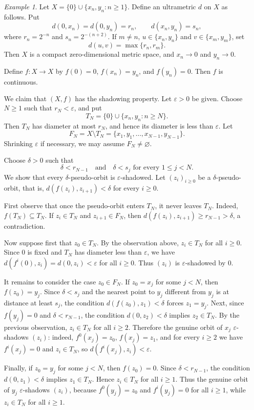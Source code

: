 \documentclass[12pt]{amsart}
\theoremstyle{definition}
\numberwithin{equation}{section}
\theoremstyle{remark}
\newtheorem{example}[theorem]{Example}
\begin{document}
\begin{example}
Let $X=\{0\}\cup\{x_n,y_n:n\geq 1\}$. Define an ultrametric $d$ on $X$ as
follows. Put
\[
    d(0,x_n)=d(0,y_n)=r_n,\qquad d(x_n,y_n)=s_n,
\]
where $r_n=2^{-n}$ and $s_n=2^{-(n+2)}$. If $m\neq n$,
$u\in\{x_n,y_n\}$ and $v\in\{x_m,y_m\}$, set
\[
    d(u,v)=\max\{r_n,r_m\}.
\]
Then $X$ is a compact zero-dimensional metric space, and $x_n\to 0$ and
$y_n\to 0$.

Define $f:X\to X$ by $f(0)=0$, $f(x_n)=y_n$, and $f(y_n)=0$. Then $f$ is
continuous.

We claim that $(X,f)$ has the shadowing property. Let $\varepsilon>0$ be given.
Choose $N\geq 1$ such that $r_N<\varepsilon$, and put
\[
    T_N=\{0\}\cup\{x_n,y_n:n\geq N\}.
\]
Then $T_N$ has diameter at most $r_N$, and hence its diameter is less than
$\varepsilon$. Let
\[
    F_N=X\setminus T_N=\{x_1,y_1,\ldots,x_{N-1},y_{N-1}\}.
\]
Shrinking $\varepsilon$ if necessary,  we may assume
$F_N\neq\varnothing$.

Choose $\delta>0$ such that
\[
    \delta< r_{N-1}
    \quad\text{and}\quad
    \delta<s_j \text{ for every } 1\leq j<N.
\]
We show that every $\delta$-pseudo-orbit is $\varepsilon$-shadowed. Let
$(z_i)_{i\geq 0}$ be a $\delta$-pseudo-orbit, that is,
$d(f(z_i),z_{i+1})<\delta$ for every $i\geq 0$.

First observe that once the pseudo-orbit enters $T_N$, it never leaves $T_N$.
Indeed, $f(T_N)\subseteq T_N$. If $z_i\in T_N$ and $z_{i+1}\in F_N$, then
$d(f(z_i),z_{i+1})\geq r_{N-1}>\delta$, a contradiction.

Now suppose first that $z_0\in T_N$. By the observation above, $z_i\in T_N$ for
all $i\geq 0$. Since $0$ is fixed and $T_N$ has diameter less than
$\varepsilon$, we have $d(f^i(0),z_i)=d(0,z_i)<\varepsilon$ for all $i\geq 0$.
Thus $(z_i)$ is $\varepsilon$-shadowed by $0$.

It remains to consider the case $z_0\in F_N$. If $z_0=x_j$ for some $j<N$, then
$f(z_0)=y_j$. Since $\delta<s_j$ and the nearest point to $y_j$ different from
$y_j$ is at distance at least $s_j$, the condition
$d(f(z_0),z_1)<\delta$ forces $z_1=y_j$. Next, since $f(y_j)=0$ and
$\delta<r_{N-1}$, the condition $d(0,z_2)<\delta$ implies $z_2\in T_N$.
By the previous observation, $z_i\in T_N$ for all $i\geq 2$. Therefore the
genuine orbit of $x_j$ $\varepsilon$-shadows $(z_i)$: indeed,
$f^0(x_j)=z_0$, $f(x_j)=z_1$, and for every $i\geq 2$ we have
$f^i(x_j)=0$ and $z_i\in T_N$, so $d(f^i(x_j),z_i)<\varepsilon$.

Finally, if $z_0=y_j$ for some $j<N$, then $f(z_0)=0$. Since
$\delta<r_{N-1}$, the condition $d(0,z_1)<\delta$ implies $z_1\in T_N$.
Hence $z_i\in T_N$ for all $i\geq 1$. Thus the genuine orbit of $y_j$
$\varepsilon$-shadows $(z_i)$, because $f^0(y_j)=z_0$ and $f^i(y_j)=0$ for
all $i\geq 1$, while $z_i\in T_N$ for all $i\geq 1$.


\end{example}
\end{document}
